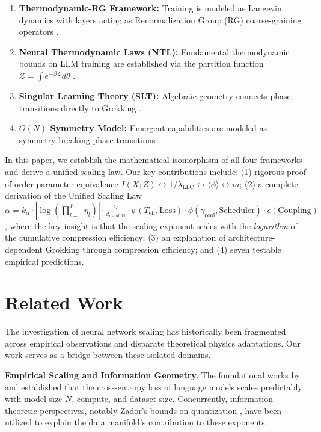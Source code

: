 \documentclass[11pt, a4paper]{article}
\theoremstyle{plain}
\def\sL{{\mathcal L}}
\def\sZ{{\mathcal Z}}
\begin{document}
\begin{enumerate}
    \item \textbf{Thermodynamic-RG Framework:} Training is modeled as Langevin dynamics with layers acting as Renormalization Group (RG) coarse-graining operators \citep{mehta2006renormalization}.
    \item \textbf{Neural Thermodynamic Laws (NTL):} Fundamental thermodynamic bounds on LLM training are established via the partition function $\sZ = \int e^{-\beta\sL}d\theta$ \citep{tegmark2505.10559}.
    \item \textbf{Singular Learning Theory (SLT):} Algebraic geometry connects phase transitions directly to Grokking \citep{watanabe2007singular,watanabe2009algebraic,michaud2023quantization}.
    \item \textbf{$O(N)$ Symmetry Model:} Emergent capabilities are modeled as symmetry-breaking phase transitions \citep{wei2022phase}.
\end{enumerate}

In this paper, we establish the mathematical isomorphism of all four frameworks and derive a unified scaling law. Our key contributions include: (1) rigorous proof of order parameter equivalence $I(X;Z) \leftrightarrow 1/\lambda_{\text{LLC}} \leftrightarrow \langle\phi\rangle \leftrightarrow m$; (2) a complete derivation of the Unified Scaling Law $\alpha = k_\alpha \cdot |\log(\prod_{l=1}^{L}\eta_l)| \cdot \frac{2s}{d_{\text{manifold}}} \cdot \psi(T_{\text{eff}},\text{Loss})\cdot\phi(\gamma_{\text{cool}},\text{Scheduler})\cdot\epsilon(\text{Coupling})$, where the key insight is that the scaling exponent scales with the \emph{logarithm} of the cumulative compression efficiency; (3) an explanation of architecture-dependent Grokking through compression efficiency; and (4) seven testable empirical predictions.

\section{Related Work}

The investigation of neural network scaling has historically been fragmented across empirical observations and disparate theoretical physics adaptations. Our work serves as a bridge between these isolated domains.

\textbf{Empirical Scaling and Information Geometry.} The foundational works by \citet{kaplan2020scaling} and \citet{hoffmann2022training} established that the cross-entropy loss of language models scales predictably with model size $N$, compute, and dataset size. Concurrently, information-theoretic perspectives, notably Zador's bounds on quantization \citep{zador1982asymptotic}, have been utilized to explain the data manifold's contribution to these exponents.
\end{document}
